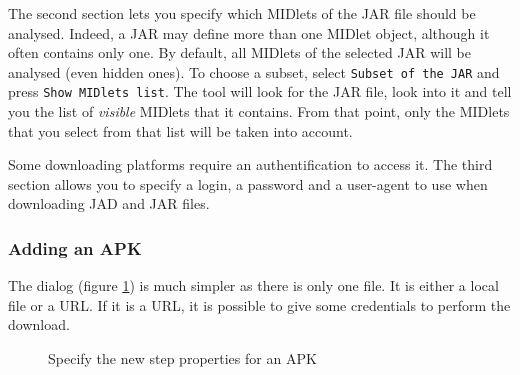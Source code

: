 The second section lets you specify which MIDlets of the JAR file
should be analysed. Indeed, a JAR may define more than one
MIDlet object, although it often contains only one. By default, all
MIDlets of the selected JAR will be analysed (even hidden ones). To choose a
subset, select \texttt{Subset of the JAR} and press \texttt{Show MIDlets
 list}. The tool will look for the JAR file, look into it and tell you the list
 of \emph{visible} MIDlets that it contains.  
 From that point, only the MIDlets that you select from that list will be taken into account.

Some downloading platforms require an authentification to access it. The third
section allows you to specify a login, a password and a user-agent to use when
downloading JAD and JAR files. 


\subsubsection{Adding an APK}
The dialog (figure \ref{figStepAndroid}) is much simpler as there is only one
file. It is either a local file or a URL. If it is a URL, it is possible to give some credentials to perform the
download. 

\begin{figure}[ht]
\begin{center}
\end{center}
\caption{Specify the new step properties for an APK}
\label{figStepAndroid}
\end{figure} 
